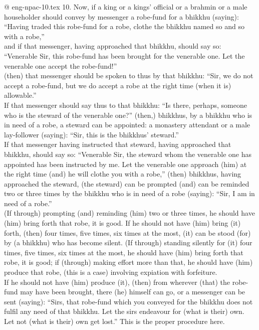 @ eng-npac-10.tex
10. Now, if a king or a kings’ official or a brahmin or a male householder should convey by messenger a robe-fund for a bhikkhu (saying): “Having traded this robe-fund for a robe, clothe the bhikkhu named so and so with a robe,” \\
and if that messenger, having approached that bhikkhu, should say so: “Venerable Sir, this robe-fund has been brought for the venerable one. Let the venerable one accept the robe-fund!”\\
(then) that messenger should be spoken to thus by that bhikkhu: “Sir, we do not accept a robe-fund, but we do accept a robe at the right time (when it is) allowable.”\\
If that messenger should say thus to that bhikkhu: “Is there, perhaps, someone who is the steward of the venerable one?” (then,) bhikkhus, by a bhikkhu who is in need of a robe, a steward can be appointed: a monastery attendant or a male lay-follower (saying): “Sir, this is the bhikkhus' steward.”\\
If that messenger having instructed that steward, having approached that bhikkhu, should say so: “Venerable Sir, the steward whom the venerable one has appointed has been instructed by me. Let the venerable one approach (him) at the right time (and) he will clothe you with a robe,” (then) bhikkhus, having approached the steward, (the steward) can be prompted (and) can be reminded two or three times by the bhikkhu who is in need of a robe (saying): “Sir, I am in need of a robe.”\\
(If through) prompting (and) reminding (him) two or three times, he should have (him) bring forth that robe, it is good. If he should not have (him) bring (it) forth, (then) four times, five times, six times at the most, (it) can be stood (for) by (a bhikkhu) who has become silent. (If through) standing silently for (it) four times, five times, six times at the most, he should have (him) bring forth that robe, it is good; if (through) making effort more than that, he should have (him) produce that robe, (this is a case) involving expiation with forfeiture.\\
If he should not have (him) produce (it), (then) from wherever (that) the robe-fund may have been brought, there (he) himself can go, or a messenger can be sent (saying): “Sirs, that robe-fund which you conveyed for the bhikkhu does not fulfil any need of that bhikkhu. Let the sirs endeavour for (what is their) own. Let not (what is their) own get lost.” This is the proper procedure here.

